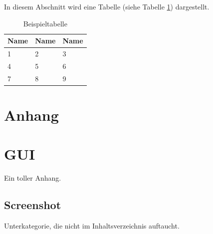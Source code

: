 \documentclass[12pt,a4paper,bibliography=totocnumbered,listof=totocnumbered]{scrartcl}
\begin{document}
In diesem Abschnitt wird eine Tabelle (siehe Tabelle \ref{tab:beispiel}) dargestellt.

\vspace{1em}
\begin{table}[!h]
	\centering
	\begin{tabular}{|l|l|l|}
		\hline
		\textbf{Name} & \textbf{Name} & \textbf{Name}\\
		\hline
		1 & 2 & 3\\
		\hline
		4 & 5 & 6\\
		\hline
		7 & 8 & 9\\
		\hline
	\end{tabular}
	\caption{Beispieltabelle}
	\label{tab:beispiel}
\end{table}



\renewcommand\refname{Quellenverzeichnis}


\pagebreak

\setcounter{page}{1}

\begin{appendix}
\section*{Anhang}
{}

\section{GUI}
Ein toller Anhang.

\subsection*{Screenshot}
\label{app:screenshot}
Unterkategorie, die nicht im Inhaltsverzeichnis auftaucht.

\end{appendix}
\end{document}

